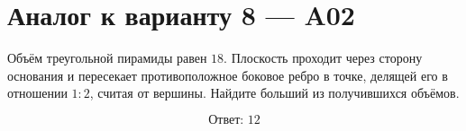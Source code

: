 \documentclass[12pt,a4paper]{article}
\begin{document}
\section*{Аналог к варианту 8 — A02}

Объём треугольной пирамиды равен \(18\). Плоскость проходит через сторону основания и пересекает противоположное боковое ребро в точке, делящей его в отношении \(1:2\), считая от вершины. Найдите больший из получившихся объёмов.

\begin{center}
\end{center}

\[
\boxed{\text{Ответ: }12}
\]
\end{document}
